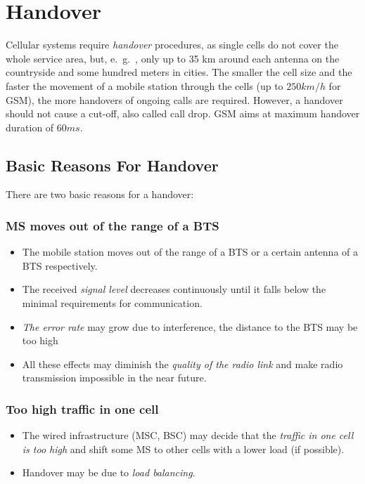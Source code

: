 \section{Handover}

Cellular systems require \textit{handover} procedures, as single cells do not cover the whole service area, but, e.\ g.\ , only up to 35 km around each antenna on the countryside and some hundred meters in cities. The smaller the cell size and the faster the movement of a mobile station through the cells (up to \(250 km/h\) for GSM), the more handovers of ongoing calls are required. However, a handover should not cause a cut-off, also called call drop. GSM aims at maximum handover duration of \(60 ms\).

\subsection{Basic Reasons For Handover}
There are two basic reasons for a handover:


\subsubsection[Out of Range]{MS moves out of the range of a BTS}
\begin{itemize}
	\item The mobile station moves out of the range of a BTS or a certain antenna of a BTS respectively.
	\item The received \textit{signal level} decreases continuously until it falls below the minimal requirements for communication.
	\item \textit{The error rate} may grow due to interference, the distance to the BTS may be too high
	\item All these effects may diminish the \textit{quality of the radio link} and make radio transmission impossible in the near future.
\end{itemize}
 


\subsubsection[High Traffic]{Too high traffic in one cell}

\begin{itemize}
	\item The wired infrastructure (MSC, BSC) may decide that the \textit{traffic in one cell is too high} and shift some MS to other cells with a lower load (if possible).
	\item Handover may be due to \textit{load balancing}.
\end{itemize}

